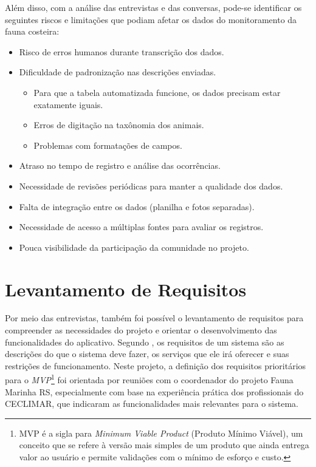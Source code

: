 Além disso, com a análise das entrevistas e das conversas, pode-se identificar os seguintes riscos e limitações que podiam afetar os dados do monitoramento da fauna costeira:

\begin{itemize}
    \item Risco de erros humanos durante transcrição dos dados.
    
    \item Dificuldade de padronização nas descrições enviadas.
    \begin{itemize}
        \item Para que a tabela automatizada funcione, os dados precisam estar exatamente iguais.
        \item Erros de digitação na taxônomia dos animais.
        \item Problemas com formatações de campos.
    \end{itemize}
    
    \item Atraso no tempo de registro e análise das ocorrências.
    
    \item Necessidade de revisões periódicas para manter a qualidade dos dados.
    
    \item Falta de integração entre os dados (planilha e fotos separadas).
    
    \item Necessidade de acesso a múltiplas fontes para avaliar os registros.
    
    \item Pouca visibilidade da participação da comunidade no projeto.
\end{itemize}


\section{Levantamento de Requisitos}

Por meio das entrevistas, também foi possível o levantamento de requisitos para compreender as necessidades do projeto e orientar o desenvolvimento das funcionalidades do aplicativo. Segundo , os requisitos de um sistema são as descrições do que o sistema deve fazer, os serviços que ele irá oferecer e suas restrições de funcionamento. Neste projeto, a definição dos requisitos prioritários para o \textit{MVP}\footnote{MVP é a sigla para 
\textit{Minimum Viable Product} (Produto Mínimo Viável), um conceito que se refere à 
versão mais simples de um produto que ainda entrega valor ao usuário e permite validações com o mínimo de esforço e custo.} 
foi orientada por reuniões com o coordenador do projeto Fauna Marinha RS, especialmente com base na experiência prática dos profissionais do CECLIMAR, que indicaram as funcionalidades mais relevantes para o sistema.

